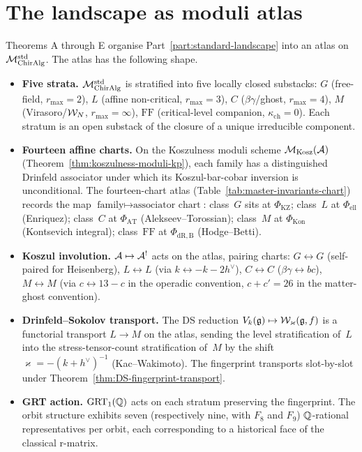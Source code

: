 \section{The landscape as moduli atlas}
\label{sec:part-iii-moduli-atlas}

Theorems A through E organise Part~\ref{part:standard-landscape} into an atlas on
$\mathcal{M}_{\mathrm{ChirAlg}}^{\mathrm{std}}$. The atlas has the following shape.

\begin{itemize}[leftmargin=*]
 \item \textbf{Five strata.} $\mathcal{M}_{\mathrm{ChirAlg}}^{\mathrm{std}}$ is stratified into
 five locally closed substacks:
 $G$ (free-field, $r_{\max} = 2$),
 $L$ (affine non-critical, $r_{\max} = 3$),
 $C$ ($\beta\gamma$/ghost, $r_{\max} = 4$),
 $M$ (Virasoro/$\mathcal{W}_N$, $r_{\max} = \infty$),
 $\mathrm{FF}$ (critical-level companion,
 $\kappa_{\mathrm{ch}} = 0$).
 Each stratum is an open substack of the closure of a unique
 irreducible component.

 \item \textbf{Fourteen affine charts.} On the Koszulness moduli
 scheme $\mathcal{M}_{\mathrm{Kosz}}(\mathcal{A})$
 \textup{(}Theorem~\ref{thm:koszulness-moduli-kp}\textup{)}, each
 family has a distinguished Drinfeld associator
 under which its Koszul-bar-cobar inversion is
 unconditional. The fourteen-chart atlas
 \textup{(}Table~\ref{tab:master-invariants-chart}\textup{)} records
 the map
 $\text{family} \mapsto \text{associator chart}$:
 class~$G$ sits at $\Phi_{\mathrm{KZ}}$;
 class~$L$ at $\Phi_{\mathrm{ell}}$ (Enriquez);
 class~$C$ at $\Phi_{\mathrm{AT}}$ (Alekseev--Torossian);
 class~$M$ at $\Phi_{\mathrm{Kon}}$ (Kontsevich integral);
 class~$\mathrm{FF}$ at $\Phi_{\mathrm{dR,B}}$ (Hodge--Betti).

 \item \textbf{Koszul involution.} $\mathcal{A} \mapsto \mathcal{A}^!$ acts on the
 atlas, pairing charts:
 $G \leftrightarrow G$ (self-paired for Heisenberg),
 $L \leftrightarrow L$ (via $k \leftrightarrow -k - 2h^\vee$),
 $C \leftrightarrow C$ ($\beta\gamma \leftrightarrow bc$),
 $M \leftrightarrow M$ (via $c \leftrightarrow 13 - c$ in the
 operadic convention, $c + c' = 26$ in the matter-ghost convention).

 \item \textbf{Drinfeld--Sokolov transport.} The DS reduction
 $V_k(\mathfrak{g}) \mapsto \mathcal{W}_\varkappa(\mathfrak{g}, f)$ is a functorial transport
 $L \to M$ on the atlas, sending the level stratification of~$L$
 into the stress-tensor-count stratification of~$M$ by the
 shift~$\varkappa = -(k + h^\vee)^{-1}$
 \textup{(}Kac--Wakimoto\textup{)}. The fingerprint transports
 slot-by-slot under
 Theorem~\ref{thm:DS-fingerprint-transport}.

 \item \textbf{GRT action.} $\mathrm{GRT}_1(\mathbb{Q})$ acts on each stratum
 preserving the fingerprint. The orbit
 structure exhibits seven (respectively nine, with $F_8$ and $F_9$)
 $\mathbb{Q}$-rational representatives per orbit, each corresponding to a
 historical face of the classical r-matrix.
\end{itemize}

